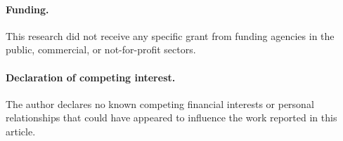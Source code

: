 \documentclass[11pt]{article}
\begin{document}
\paragraph{Funding.} This research did not receive any specific grant from funding agencies in the public, commercial, or not-for-profit sectors.

\paragraph{Declaration of competing interest.} The author declares no known competing financial interests or personal relationships that could have appeared to influence the work reported in this article.


\end{document}
